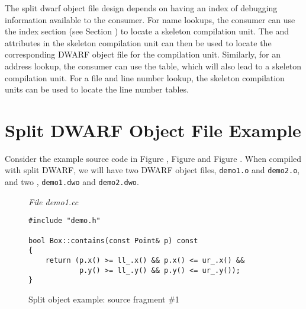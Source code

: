 The split dwarf object file design depends on having an index of 
debugging information available to the consumer. For name lookups, 
the consumer can use the \dotdebugnames{} index section (see 
Section ) to 
locate a skeleton compilation unit. The
\DWATcompdir{} and \DWATdwoname{} attributes in the skeleton
compilation unit can then be used to locate the corresponding
DWARF object file for the compilation unit. Similarly, for an
address lookup, the consumer can use the \dotdebugaranges{} table,
which will also lead to a skeleton compilation unit. For a file
and line number lookup, the skeleton compilation units can be
used to locate the line number tables.

\clearpage

\section{Split DWARF Object File Example}
\label{app:splitdwarfobjectfileexample}
Consider the example source code in 
Figure , 
Figure  and
Figure .
When compiled with split DWARF, we will have two DWARF object files,
\texttt{demo1.o} and \texttt{demo2.o}, and two , 
\texttt{demo1.dwo} and \texttt{demo2.dwo}.

\vspace{2cm}
\begin{figure}[ht]
\textit{File demo1.cc}
\begin{lstlisting}
#include "demo.h"

bool Box::contains(const Point& p) const
{
    return (p.x() >= ll_.x() && p.x() <= ur_.x() &&
            p.y() >= ll_.y() && p.y() <= ur_.y());
}
\end{lstlisting}
\caption{Split object example: source fragment \#1}
\label{fig:splitobjectexamplesourcefragment1}
\end{figure}

